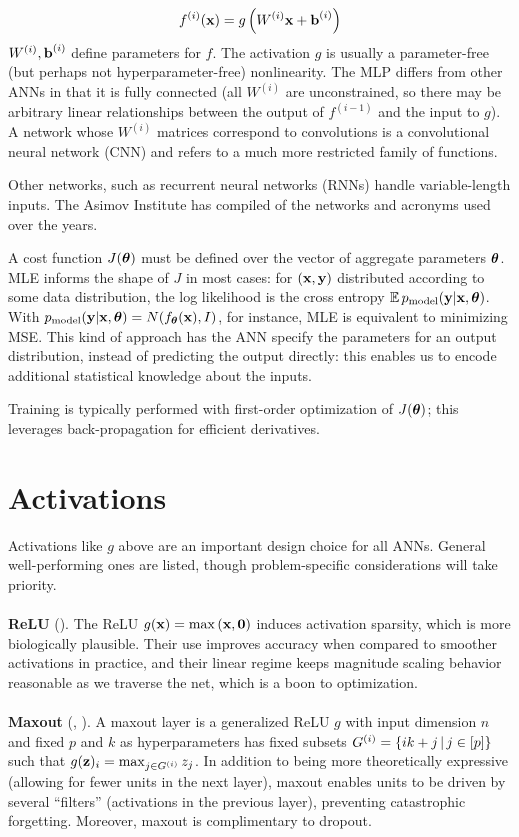 \documentclass{article}
\begin{document}
$$
f^{(i)}(\textbf{x})=g\left({W^{(i)}\textbf{x}+\textbf{b}^{(i)}}\right)
$$
$W^{(i)},\textbf{b}^{(i)}$ define parameters for $f$. The activation $g$ is usually a parameter-free (but perhaps not hyperparameter-free) nonlinearity. The MLP differs from other ANNs in that it is fully connected (all $W^{(i)}$ are unconstrained, so there may be arbitrary linear relationships between the output of $f^{(i-1)}$ and the input to $g$). A network whose $W^{(i)}$ matrices correspond to convolutions is a convolutional neural network (CNN) and refers to a much more restricted family of functions.

Other networks, such as recurrent neural networks (RNNs) handle variable-length inputs. The Asimov Institute has compiled  of the networks and acronyms used over the years.

A cost function $J({\boldsymbol\theta})$ must be defined over the vector of aggregate parameters ${\boldsymbol\theta}$. MLE informs the shape of $J$ in most cases: for $(\textbf{x},\textbf{y})$ distributed according to some data distribution, the log likelihood is the cross entropy $\operatorname{\mathbb{E}} p_\text{model}(\textbf{y}|\textbf{x},{\boldsymbol\theta})$. With $p_\text{model}(\textbf{y}|\textbf{x},{\boldsymbol\theta})=N(f_{\boldsymbol\theta}(\textbf{x}),I)$, for instance, MLE is equivalent to minimizing MSE. This kind of approach has the ANN specify the parameters for an output distribution, instead of predicting the output directly: this enables us to encode additional statistical knowledge about the inputs.

Training is typically performed with first-order optimization of $J({\boldsymbol\theta})$; this leverages back-propagation for efficient derivatives.

\section{Activations}

Activations like $g$ above are an important design choice for all ANNs. General well-performing ones are listed, though problem-specific considerations will take priority.
\\\\
\noindent
\textbf{ReLU} (). The ReLU $g(\textbf{x})=\max\left({\textbf{x},\textbf{0}}\right)$ induces activation sparsity, which is more biologically plausible. Their use improves accuracy when compared to smoother activations in practice, and their linear regime keeps magnitude scaling behavior reasonable as we traverse the net, which is a boon to optimization.
\\\\
\noindent
\textbf{Maxout} (, ). A maxout layer is a generalized ReLU $g$ with input dimension $n$ and fixed $p$ and $k$ as hyperparameters has fixed subsets $G^{(i)}=\left\{ ik+j \,\middle|\, j\in[p] \right\}$ such that $g(\textbf{z})_i=\max_{j\in G^{(i)}}z_j$. In addition to being more theoretically expressive (allowing for fewer units in the next layer), maxout enables units to be driven by several ``filters'' (activations in the previous layer), preventing catastrophic forgetting. Moreover, maxout is complimentary to dropout.
\end{document}
